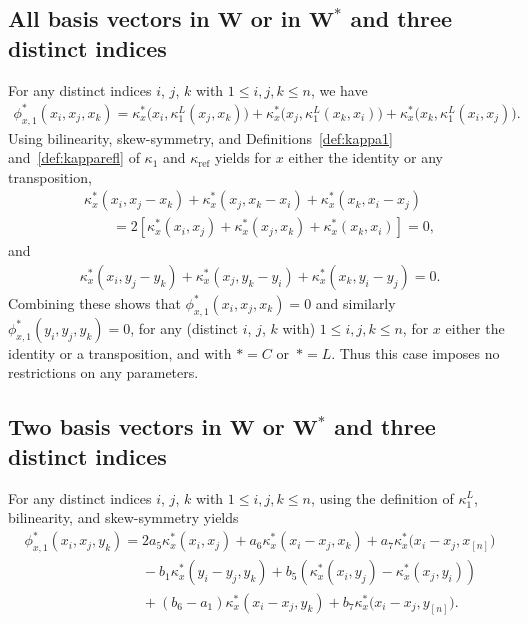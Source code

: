 \documentclass[pdftex]{sigma}
\numberwithin{equation}{section}
\DeclareMathOperator{\refl}{ref}
\begin{document}
\subsection[All basis vectors in W or in W* and three distinct indices]
{All basis vectors in $\boldsymbol W$ or in $\boldsymbol{W^*}$ and three distinct indices}\label{AllVecInW}

For any distinct indices $i$, $j$, $k$ with $1 \leq i, j, k \leq n$, we have
\begin{gather*}
\phi_{x,1}^*(x_i,x_j,x_k)=\kappa^*_x\big(x_i,\kappa^L_1(x_j,x_k)\big)+\kappa^*_x\big(x_j,\kappa^L_1(x_k,x_i)\big) +\kappa^*_x\big(x_k,\kappa^L_1(x_i,x_j)\big).
\end{gather*}
Using bilinearity, skew-symmetry, and Definitions~\ref{def:kappa1}
and~\ref{def:kapparefl} of $\kappa_1$ and
$\kappa_{\refl}$ yields for $x$ either the identity or
any transposition,
\begin{gather*}
\kappa^*_x(x_i,x_j-x_k)+\kappa^*_x(x_j,x_k-x_i)+\kappa^*_x(x_k,x_i-x_j)
\\ \qquad
{}=2[\kappa^*_x(x_i,x_j)+\kappa^*_x(x_j,x_k)+\kappa^*_x(x_k,x_i)]=0,	
\end{gather*}
and
\begin{gather*}
\kappa^*_x(x_i,y_j-y_k)+\kappa^*_x(x_j,y_k-y_i)+\kappa^*_x(x_k,y_i-y_j)=0.
\end{gather*}
Combining these shows that $\phi_{x,1}^*(x_i,x_j,x_k)=0$
and similarly $\phi_{x,1}^*(y_i,y_j,y_k)=0$, for any (distinct $i$, $j$, $k$ with) $1 \leq i, j, k \leq n$,
for $x$ either the identity or a transposition, and with $*=C$ or~$*=L$.
Thus this case imposes no restrictions on any parameters.

\subsection[Two basis vectors in W or W* and three distinct indices]
{Two basis vectors in $\boldsymbol W$ or $\boldsymbol{W^*}$ and three distinct indices}%

For any distinct indices $i$, $j$, $k$ with $1 \leq i, j, k \leq n$,
using the definition of $\kappa^L_1$, bilinearity, and skew-symmetry yields
\begin{gather*}
\phi_{x,1}^*(x_i,x_j,y_k)
=2a_5 \kappa^*_x(x_i,x_j) + a_6 \kappa^*_x(x_i-x_j,x_k) + a_7 \kappa^*_x\big(x_i-x_j,x_{[n]}\big)
\\ \phantom{\phi_{x,1}^*(x_i,x_j,y_k)=}
{}-b_1 \kappa^*_x(y_i-y_j,y_k)+b_5\left(\kappa^*_x(x_i,y_j) - \kappa^*_x(x_j,y_i)\right)
\\ \phantom{\phi_{x,1}^*(x_i,x_j,y_k)=}
{}+(b_6 - a_1)\kappa^*_x(x_i-x_j,y_k) + b_7 \kappa^*_x\big(x_i-x_j,y_{[n]}\big).
\end{gather*}
\end{document}
